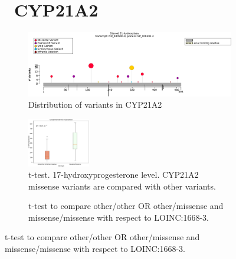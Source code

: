 \begin{figure}[htbp]
\section*{ CYP21A2}
\centering
\begin{subfigure}[b]{0.95\textwidth}
\centering
\includegraphics[width=\textwidth]{ img/CYP21A2_protein_diagram.pdf} 
\captionsetup{justification=raggedright,singlelinecheck=false}
\caption{Distribution of variants in CYP21A2}
\end{subfigure}

\vspace{2em}

\begin{subfigure}[b]{0.95\textwidth}
\centering
\includegraphics[width=0.3\textwidth]{ img/CYP21A2_stats.pdf} 
\captionsetup{justification=raggedright,singlelinecheck=false}
\caption{t-test. 17-hydroxyprogesterone level. CYP21A2 missense variants are compared with other variants.}
\end{subfigure}

\vspace{2em}

\begin{subfigure}[b]{0.95\textwidth}
\captionsetup{justification=raggedright,singlelinecheck=false}
\caption{t-test to compare other/other OR other/missense and missense/missense with respect to LOINC:1668-3. }
\end{subfigure}


\end{figure}
